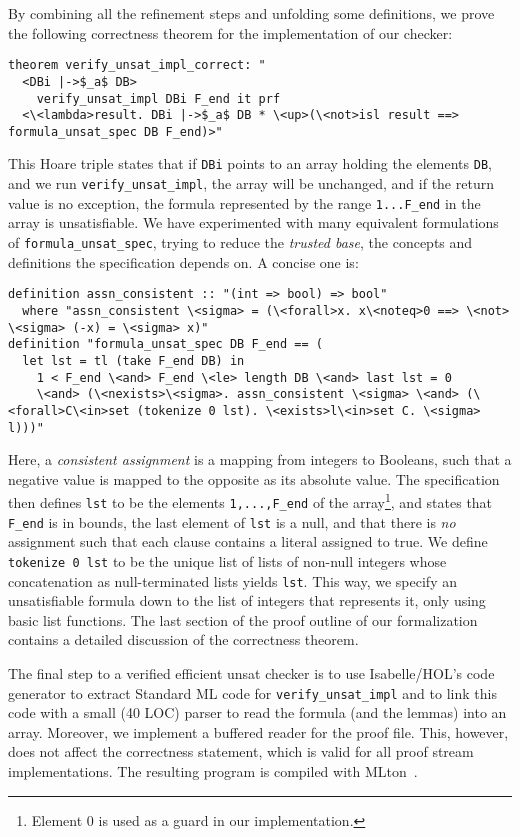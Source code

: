 \documentclass{llncs}
\newcommand{\isai}{\lstinline[language=isabelle,basicstyle=\normalsize\ttfamily\slshape]}
\begin{document}
By combining all the refinement steps and unfolding some definitions, we prove the following correctness theorem for the implementation of our checker:
\begin{lstlisting}
theorem verify_unsat_impl_correct: "
  <DBi |->$_a$ DB> 
    verify_unsat_impl DBi F_end it prf
  <\<lambda>result. DBi |->$_a$ DB * \<up>(\<not>isl result ==> formula_unsat_spec DB F_end)>"
\end{lstlisting}
This Hoare triple states that if \isai$DBi$ points to an array holding the elements \isai$DB$,
and we run \isai$verify_unsat_impl$, the array will be unchanged, and if the return value is no exception,
the formula represented by the range \isai$1...F_end$ in the array is unsatisfiable. 
We have experimented with many equivalent formulations of \isai{formula_unsat_spec}, trying to reduce the \emph{trusted base}, 
\ie the concepts and definitions the specification depends on. A concise one is:
\begin{lstlisting}
definition assn_consistent :: "(int => bool) => bool"
  where "assn_consistent \<sigma> = (\<forall>x. x\<noteq>0 ==> \<not> \<sigma> (-x) = \<sigma> x)"
definition "formula_unsat_spec DB F_end == (
  let lst = tl (take F_end DB) in
    1 < F_end \<and> F_end \<le> length DB \<and> last lst = 0 
    \<and> (\<nexists>\<sigma>. assn_consistent \<sigma> \<and> (\<forall>C\<in>set (tokenize 0 lst). \<exists>l\<in>set C. \<sigma> l)))"
\end{lstlisting}
Here, a \emph{consistent assignment} is a mapping from integers to Booleans, such that a negative value is mapped to the opposite as its absolute value.
The specification then defines \isai$lst$ to be the elements \isai$1,...,F_end$ of the array\footnote{Element $0$ is used as a guard in our implementation.}, and
states that \isai$F_end$ is in bounds, the last element of \isai$lst$ is a null, and that there is \emph{no} assignment such that each clause contains a literal assigned to true. 
We define \isai{tokenize 0 lst} to be the unique list of lists of non-null integers whose concatenation as null-terminated lists yields \isai{lst}.
This way, we specify an unsatisfiable formula down to the list of integers that represents it, only using basic list functions. 
The last section of the proof outline of our formalization~\cite{GRATchk-proof-outline} contains a detailed discussion of the correctness theorem.

The final step to a verified efficient unsat checker is to use Isabelle/HOL's code generator to extract Standard ML code for \isai{verify_unsat_impl} and to
link this code with a small (40 LOC) parser to read the formula (and the lemmas) into an array. 
Moreover, we implement a buffered reader for the proof file. This, however, does not affect the correctness statement, which is 
valid for all proof stream implementations. The resulting program is compiled with MLton~\cite{MLton}.
\end{document}
